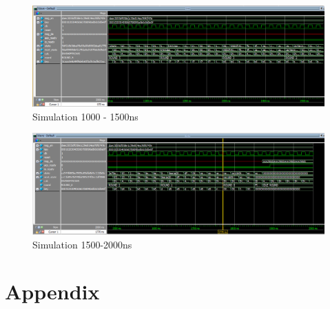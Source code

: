 \documentclass[journal, twocolumn, final,11pt,letterpaper]{IEEEtran}
\begin{document}
\begin{figure} [H]
	\centering
	\includegraphics[scale=.35]{simulate-1000-1500.png}
	\caption{Simulation 1000 - 1500ns\label{fig:1000-1500}}
\end{figure}          


\begin{figure} [H]
	\centering
	\includegraphics[scale=.35]{simulate-1500-2000.png}
	\caption{Simulation 1500-2000ns\label{fig:1500-2000}}
\end{figure}          


     

\section*{Appendix}
%
\end{document}
